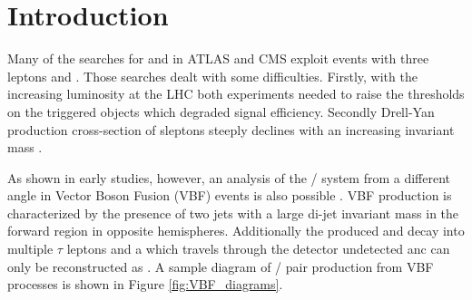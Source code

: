 \section {Introduction}

Many of the searches for \charginopm and \neutralinotwo in ATLAS \cite{Aad:2012hba, ATLAS:2012ab} and CMS \cite{Chatrchyan:2012mea} exploit events with three leptons and \met. Those searches dealt with some difficulties. Firstly, with the increasing luminosity at the LHC both experiments needed to raise the \pt thresholds on the triggered objects which degraded signal efficiency. Secondly Drell-Yan production cross-section of sleptons steeply declines with an increasing invariant mass \cite{Baer:1997nh}.

As shown in early studies, however, an analysis of the \charginopm / \neutralinotwo system from a different angle  in Vector Boson Fusion (VBF) events is also possible \cite{Bjorken:1992er}. VBF production is characterized by the presence of two jets with a large di-jet invariant mass in the forward region in opposite hemispheres. Additionally the produced \charginopm and \neutralinotwo decay into multiple $\tau$ leptons and a \neutralinoone which travels through the detector undetected anc can only be reconstructed as \met. A sample diagram of \charginopm / \neutralinotwo pair production from VBF processes is shown in Figure \ref{fig:VBF_diagrams}. 

